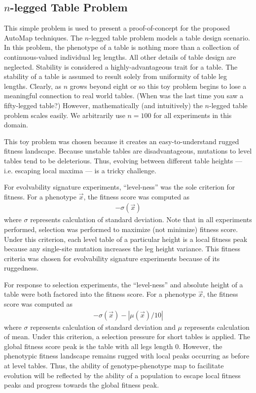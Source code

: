 \subsection{$n$-legged Table Problem}

This simple problem is used to present a proof-of-concept for the proposed AutoMap techniques.
The $n$-legged table problem models a table design scenario.
In this problem, the phenotype of a table is nothing more than a collection of continuous-valued individual leg lengths.
All other details of table design are neglected.
Stability is considered a highly-advantageous trait for a table.
The stability of a table is assumed to result solely from uniformity of table leg lengths.
Clearly, as $n$ grows beyond eight or so this toy problem begins to lose a meaningful connection to real world tables.
(When was the last time you saw a fifty-legged table?)
However, mathematically (and intuitively) the $n$-legged table problem scales easily.
We arbitrarily use $n=100$ for all experiments in this domain.

This toy problem was chosen because it creates an easy-to-understand rugged fitness landscape.
Because unstable tables are disadvantageous, mutations to level tables tend to be deleterious.
Thus, evolving between different table heights --- i.e. escaping local maxima --- is a tricky challenge.

For evolvability signature experiments, ``level-ness'' was the sole criterion for fitness.
For a phenotype $\vec{x}$, the fitness score was computed as
\begin{align*}
-\sigma(\vec{x})
\end{align*}
where $\sigma$ represents calculation of standard deviation.
Note that in all experiments performed, selection was performed to maximize (not minimize) fitness score.
Under this criterion, each level table of a particular height is a local fitness peak because any single-site mutation increases the leg height variance.
This fitness criteria was chosen for evolvability signature experiments because of its ruggedness.

For response to selection experiments, the ``level-ness'' and absolute height of a table were both factored into the fitness score.
For a phenotype $\vec{x}$, the fitness score was computed as
\begin{align*}
-\sigma(\vec{x}) - |\mu(\vec{x})/10|
\end{align*}
where $\sigma$ represents calculation of standard deviation and $\mu$ represents calculation of mean.
Under this criterion, a selection pressure for short tables is applied.
The global fitness score peak is the table with all legs length 0.
However, the phenotypic fitness landscape remains rugged with local peaks occurring as before at level tables.
Thus, the ability of genotype-phenotype map to facilitate evolution will be reflected by the ability of a population to escape local fitness peaks and progress towards the global fitness peak.

